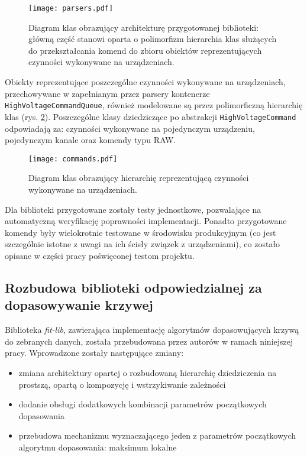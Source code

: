 \begin{figure}[H]
\centering
\texttt{[image: parsers.pdf]}
\caption{Diagram klas obrazujący architekturę przygotowanej biblioteki: główną część stanowi oparta o polimorfizm hierarchia klas służących do przekształcania komend do zbioru obiektów reprezentujących czynności wykonywane na urządzeniach. }
\label{fig:psu_parsers}
\end{figure}

Obiekty reprezentujące poszczególne czynności wykonywane na urządzeniach, przechowywane w zapełnianym przez parsery kontenerze \lstinline{HighVoltageCommandQueue}, również modelowane są przez polimorficzną hierarchię klas (rys. \ref{fig:psu_commands}). Poszczególne klasy dziedziczące po abstrakcji \lstinline{HighVoltageCommand} odpowiadają za: czynności wykonywane na pojedynczym urządzeniu, pojedynczym kanale oraz komendy typu RAW.

\begin{figure}[H]
\centering
\texttt{[image: commands.pdf]}
\caption{Diagram klas obrazujący hierarchię reprezentującą czynności wykonywane na urządzeniach.}
\label{fig:psu_commands}
\end{figure}

Dla biblioteki przygotowane zostały testy jednostkowe, pozwalające na automatyczną weryfikację poprawności implementacji. Ponadto przygotowane komendy były wielokrotnie testowane w środowisku produkcyjnym (co jest szczególnie istotne z uwagi na ich ścisły związek z urządzeniami), co zostało opisane w części pracy poświęconej testom projektu.

\subsection{Rozbudowa biblioteki odpowiedzialnej za dopasowywanie krzywej}
Biblioteka \emph{fit-lib}, zawierająca implementację algorytmów dopasowujących krzywą do zebranych danych, została przebudowana przez autorów w ramach niniejszej pracy. Wprowadzone zostały następujące zmiany:
\begin{itemize}
    \item zmiana architektury opartej o rozbudowaną hierarchię dziedziczenia na prostszą, opartą o kompozycję i wstrzykiwanie zależności
    \item dodanie obsługi dodatkowych kombinacji parametrów początkowych dopasowania
    \item przebudowa mechanizmu wyznaczającego jeden z parametrów początkowych algorytmu dopasowania: maksimum lokalne 
\end{itemize}

